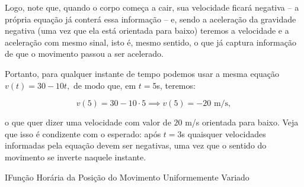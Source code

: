 \begin{exemplo}[Nível II]
\begin{enumerate}
    Logo, note que, quando o corpo começa a cair, sua velocidade ficará negativa -- a própria equação já conterá essa informação -- e, sendo a aceleração da gravidade negativa (uma vez que ela está orientada para baixo) teremos a velocidade e a aceleração com mesmo sinal, isto é, mesmo sentido, o que já captura informação de que o movimento passou a ser acelerado. 

    Portanto, para qualquer instante de tempo podemos usar a mesma equação $v(t)=30-10t,$ de modo que, em $t=5$s, teremos:

    $$ v(5)=30-10\cdot 5 \implies v(5)=-20 \text{ m/s},$$

    \noindent o que quer dizer uma velocidade com valor de $20$ m/s orientada para baixo. Veja que isso é condizente com o esperado: após $t=3$s quaisquer velocidades informadas pela equação devem ser negativas, uma vez que o sentido do movimento se inverte naquele instante.

    
\end{enumerate}

\end{exemplo}




\vspace{0.3cm}




















\begin{secnivel}{I}{Função Horária da Posição do Movimento Uniformemente Variado}
 

  
\end{secnivel}









